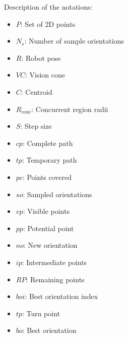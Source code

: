     Description of the notations:
    \begin{itemize}[noitemsep,topsep=0pt]
        \item $P$: Set of 2D points
        \item $N_s$: Number of sample orientations
        \item $R$: Robot pose
        \item $VC$: Vision cone
        \item $C$: Centroid
        \item $R_{\text{conc}}$: Concurrent region radii
        \item $S$: Step size
        \item $cp$: Complete path
        \item $tp$: Temporary path
        \item $pc$: Points covered
        \item $so$: Sampled orientations
        \item $vp$: Visible points
        \item $pp$: Potential point
        \item $no$: New orientation
        \item $ip$: Intermediate points
        \item $RP$: Remaining points
        \item $boi$: Best orientation index
        \item $tp$: Turn point
        \item $bo$: Best orientation
    \end{itemize}
    


